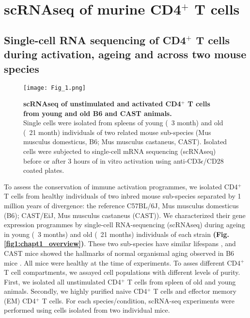 
\section{scRNAseq of murine CD4$^+$ T cells}
\subsection*{Single-cell RNA sequencing of CD4$^+$ T cells during activation, ageing and across two mouse species}

\begin{wrapfigure}{r}{0.5\textwidth}
\centering    
\texttt{[image: Fig\_1.png]}
\caption[scRNAseq of CD4$^+$ T cells from young and old mice.]{\textbf{scRNAseq of unstimulated and activated CD4$^+$ T cells from young and old B6 and CAST animals.} \\
Single cells were isolated from spleens of young (~3 month) and old (~21 month) individuals of two related mouse sub-species (Mus musculus domesticus, B6; Mus musculus castaneus, CAST). Isolated cells were subjected to single-cell mRNA sequencing (scRNAseq) before or after 3 hours of in vitro activation using anti-CD3$\epsilon$/CD28 coated plates.}
\label{fig:chapt1_overview}
\end{wrapfigure}

To assess the conservation of immune activation programmes, we isolated CD4$^+$ T cells from healthy individuals of two inbred mouse sub-species separated by 1 million years of divergence: the reference C57BL/6J, Mus musculus domesticus (B6); CAST/EiJ, Mus musculus castaneus (CAST)). We characterized their gene expression programmes by single-cell RNA-sequencing (scRNAseq) during ageing in young (~3 months) and old (~21 months) individuals of each strain \textbf{(Fig. \ref{fig1:chapt1_overview})}. These two sub-species have similar lifespans \citep{Yuan2011}, and CAST mice showed the hallmarks of normal organismal aging observed in B6 mice \citep{Rodwell2004}. All mice were healthy at the time of experiments. To asses different CD4$^+$ T cell compartments, we assayed cell populations with different levels of purity. First, we isolated all unstimulated CD4$^+$ T cells from spleen of old and young animals. Secondly, we highly purified naive CD4$^+$ T cells and effector memory (EM) CD4$^+$ T cells. For each species/condition, scRNA-seq experiments were performed using cells isolated from two individual mice.


